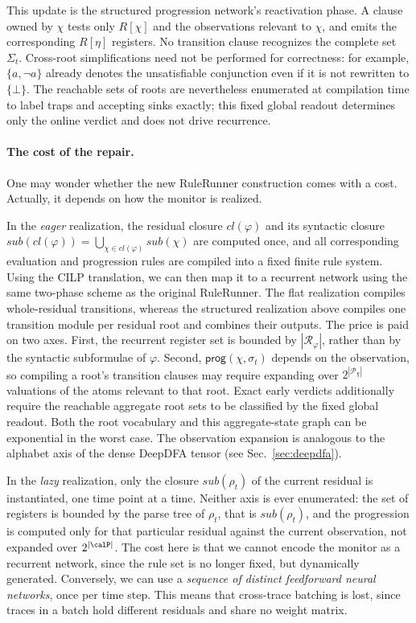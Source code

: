 This update is the structured progression network's reactivation phase.  A
clause owned by $\chi$ tests only $R[\chi]$ and the observations relevant to
$\chi$, and emits the corresponding $R[\eta]$ registers.  No transition clause
recognizes the complete set $\Sigma_t$.  Cross-root simplifications need not be
performed for correctness: for example, $\{a,\neg a\}$ already denotes the
unsatisfiable conjunction even if it is not rewritten to $\{\bot\}$.  The
reachable sets of roots are nevertheless enumerated at compilation time to
label traps and accepting sinks exactly; this fixed global readout determines
only the online verdict and does not drive recurrence.

\paragraph{The cost of the repair.}
One may wonder whether the new RuleRunner construction comes with a cost. Actually, it depends on how the monitor is realized. 

In the \emph{eager} realization, the residual closure $cl(\varphi)$ and its syntactic closure $sub(cl(\varphi)) = \bigcup_{\chi\in cl(\varphi)}sub(\chi)$ are computed once, and all corresponding evaluation and progression rules are compiled into a fixed finite rule system. Using the CILP translation, we can then map it to a recurrent network using the same two-phase scheme as the original RuleRunner. The flat realization compiles whole-residual transitions, whereas the structured realization above compiles one transition module per residual root and combines their outputs.
The price is paid on two axes. First, the recurrent register set is bounded by $|\mathcal R_\varphi|$, rather than by the syntactic subformulae of $\varphi$. Second, $\mathsf{prog}(\chi,\sigma_t)$ depends on the observation, so compiling a root's transition clauses may require expanding over $2^{|\mathcal P_\chi|}$ valuations of the atoms relevant to that root. Exact early verdicts additionally require the reachable aggregate root sets to be classified by the fixed global readout. Both the root vocabulary and this aggregate-state graph can be exponential in the worst case. The observation expansion is analogous to the alphabet axis of the dense DeepDFA tensor (see Sec.~\ref{sec:deepdfa}).

In the \emph{lazy} realization, only the closure $sub(\rho_t)$ of the current residual is instantiated, one time point at a time. Neither axis is ever enumerated: the set of registers is bounded by the parse tree of $\rho_t$, that is $sub(\rho_t)$, and the progression is computed only for that particular residual against the current observation, not expanded over $2^{|\calP|}$. 
The cost here is that we cannot encode the monitor as a recurrent network, since the rule set is no longer fixed, but dynamically generated. Conversely, we can use a \emph{sequence of distinct feedforward neural networks}, once per time step. This means that cross-trace batching is lost, since traces in a batch hold different residuals and share no weight matrix.

